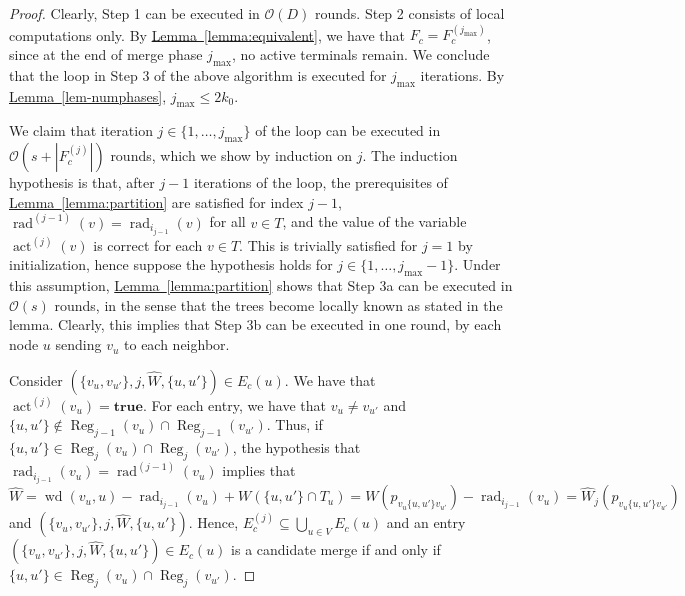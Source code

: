 \documentclass[letterpaper,11pt]{article}
\newcommand{\namedref}[2]{\hyperref[#2]{#1~\ref*{#2}}}
\newcommand{\lemmaref}[1]{\namedref{Lemma}{#1}}
\newcommand{\BO}{\mathcal{O}}
\DeclareMathOperator{\act}{act}
\DeclareMathOperator{\moat}{rad}
\DeclareMathOperator{\Wd}{wd}
\DeclareMathOperator{\reg}{Reg}
\newcommand{\true}{\mathbf{true}}
\begin{document}
\begin{proof}
Clearly, Step 1 can be executed in $\BO(D)$ rounds. Step 2 consists of local
computations only. By \lemmaref{lemma:equivalent}, we have that
$F_c=F_c^{(j_{\max})}$, since at the end of merge phase $j_{\max}$, no active
terminals remain. We conclude that the loop in Step 3 of the above algorithm is
executed for $j_{\max}$ iterations. By \lemmaref{lem-numphases}, $j_{\max}\leq
2k_0$.

We claim that iteration $j\in \{1,\ldots,j_{\max}\}$ of the loop can be executed
in $\BO(s+|F_c^{(j)}|)$ rounds, which we show by induction on $j$. The induction
hypothesis is that, after $j-1$ iterations of the loop, the prerequisites of
\lemmaref{lemma:partition} are satisfied for index $j-1$,
$\moat^{(j-1)}(v)=\moat_{i_{j-1}}(v)$ for all $v\in T$, and the value of the
variable $\act^{(j)}(v)$ is correct for each $v\in T$. This is trivially satisfied
for $j=1$ by initialization, hence suppose the hypothesis holds for
$j\in\{1,\ldots,j_{\max}-1\}$. Under this assumption, \lemmaref{lemma:partition}
shows that Step 3a can be executed in $\BO(s)$ rounds, in the sense that the
trees become locally known as stated in the lemma. Clearly, this implies that
Step 3b can be executed in one round, by each node $u$ sending $v_u$ to each
neighbor.

Consider $(\{v_u,v_{u'}\},j,\hat{W},\{u,u'\})\in E_c(u)$. We have that
$\act^{(j)}(v_u)=\true$. For each entry, we have that $v_u\neq
v_{u'}$ and $\{u,u'\}\notin \reg_{j-1}(v_u)\cap \reg_{j-1}(v_{u'})$. Thus,
if $\{u,u'\}\in \reg_j(v_u)\cap \reg_j(v_{u'})$, the hypothesis that
$\moat_{i_{j-1}}(v_u)=\moat^{(j-1)}(v_u)$ implies that
\begin{equation*}
\hat{W}=\Wd(v_u,u)-\moat_{i_{j-1}}(v_u)+W(\{u,u'\}\cap T_u)
=W(p_{v_u\{u,u'\}v_{u'}})-\moat_{i_{j-1}}(v_u)=\hat{W}_j(p_{v_u\{u,u'\}v_{u'}})
\end{equation*}
and $(\{v_u,v_{u'}\},j,\hat{W},\{u,u'\})$. Hence,
$E_c^{(j)}\subseteq \bigcup_{u\in V}E_c(u)$ and an entry
$(\{v_u,v_{u'}\},j,\hat{W},\{u,u'\})\in E_c(u)$ is a candidate merge if and only
if $\{u,u'\}\in \reg_j(v_u)\cap \reg_j(v_{u'})$.


\end{proof}
\end{document}
